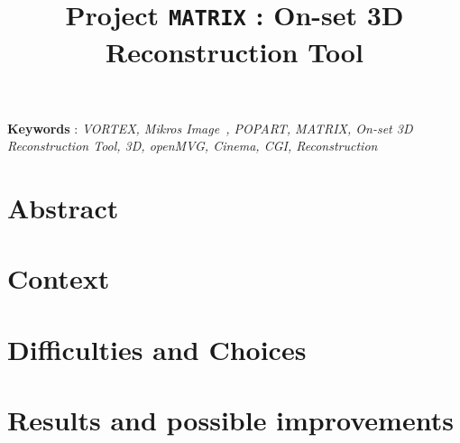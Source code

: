 \documentclass[extendedabs]{bmvc2k}
\begin{document}
\title{Project \texttt{MATRIX} : On-set 3D Reconstruction Tool }


\maketitle
\noindent
\textbf{Keywords} : \textit{VORTEX, Mikros Image~\cite{mikros}, POPART, MATRIX, On-set 3D Reconstruction Tool, 3D, openMVG, Cinema, CGI, Reconstruction}

\section*{Abstract}


\section{Context}
 

\section{Difficulties and Choices}


\section{Results and possible improvements}



\end{document}
